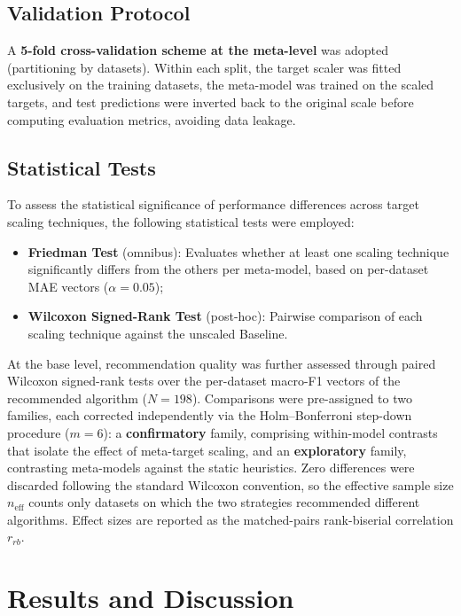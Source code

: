 \documentclass[12pt]{article}
\begin{document}
\subsection{Validation Protocol}

A \textbf{5-fold cross-validation scheme at the meta-level} was adopted (partitioning by datasets). Within each split, the target scaler was fitted exclusively on the training datasets, the meta-model was trained on the scaled targets, and test predictions were inverted back to the original scale before computing evaluation metrics, avoiding data leakage.

\subsection{Statistical Tests}

To assess the statistical significance of performance differences across target scaling techniques, the following statistical tests were employed:
\begin{itemize}
  \item \textbf{Friedman Test} (omnibus): Evaluates whether at least one scaling technique significantly differs from the others per meta-model, based on per-dataset MAE vectors ($\alpha = 0.05$);
  \item \textbf{Wilcoxon Signed-Rank Test} (post-hoc): Pairwise comparison of each scaling technique against the unscaled Baseline.
\end{itemize}

At the base level, recommendation quality was further assessed through paired Wilcoxon signed-rank tests over the per-dataset macro-F1 vectors of the recommended algorithm ($N = 198$). Comparisons were pre-assigned to two families, each corrected independently via the Holm--Bonferroni step-down procedure ($m = 6$): a \textbf{confirmatory} family, comprising within-model contrasts that isolate the effect of meta-target scaling, and an \textbf{exploratory} family, contrasting meta-models against the static heuristics. Zero differences were discarded following the standard Wilcoxon convention, so the effective sample size $n_{\text{eff}}$ counts only datasets on which the two strategies recommended different algorithms. Effect sizes are reported as the matched-pairs rank-biserial correlation $r_{rb}$.

\section{Results and Discussion}
\end{document}
